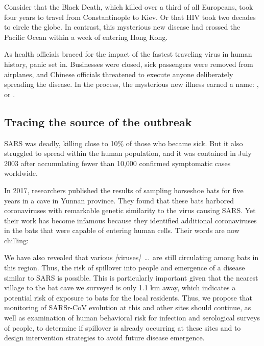Consider that the Black Death, which killed over a third of all Europeans, took four years to travel from Constantinople to Kiev. Or that HIV took two decades to circle the globe. In contrast, this mysterious new disease had crossed the Pacific Ocean within a week of entering Hong Kong.

As health officials braced for the impact of the fastest traveling virus in human history, panic set in. Businesses were closed, sick passengers were removed from airplanes, and Chinese officials threatened to execute anyone deliberately spreading the disease. In the process, the mysterious new illness earned a name: , or .

\FloatBarrier
{}
\subsection{Tracing the source of the outbreak}

SARS was deadly, killing close to 10\% of those who became sick. But it also struggled to spread within the human population, and it was contained in July 2003 after accumulating fewer than 10,000 confirmed symptomatic cases worldwide.

In 2017, researchers published the results of sampling horseshoe bats for five years in a cave in Yunnan province. They found that these bats harbored coronaviruses with remarkable genetic similarity to the virus causing SARS. Yet their work has become infamous because they identified additional coronaviruses in the bats that were capable of entering human cells. Their words are now chilling:

\begin{itquote}
We have also revealed that various \emph{[}viruses\emph{]}~\ldots~are still circulating among bats in this region. Thus, the risk of spillover into people and emergence of a disease similar to SARS is possible. This is particularly important given that the nearest village to the bat cave we surveyed is only 1.1 km away, which indicates a potential risk of exposure to bats for the local residents. Thus, we propose that monitoring of SARSr-CoV evolution at this and other sites should continue, as well as examination of human behavioral risk for infection and serological surveys of people, to determine if spillover is already occurring at these sites and to design intervention strategies to avoid future disease emergence.
\end{itquote}


